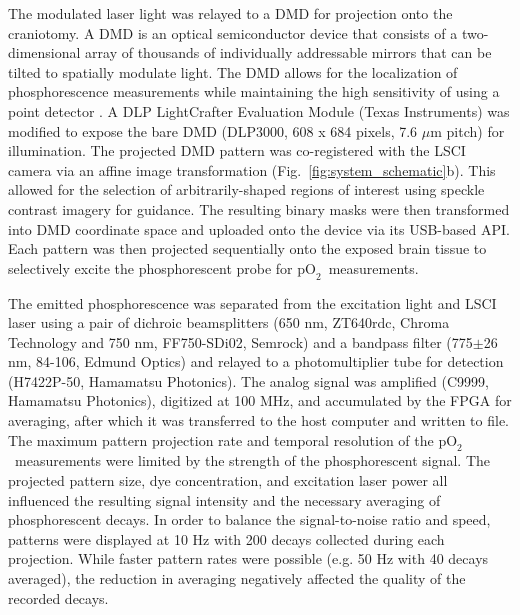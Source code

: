 \documentclass[12pt]{spieman}  %
\newcommand{\pO}{\ensuremath{\text{pO}_2}}
\begin{document}
\begin{spacing}{2}
The modulated laser light was relayed to a DMD for projection onto the craniotomy. A DMD is an optical semiconductor device that consists of a two-dimensional array of thousands of individually addressable mirrors that can be tilted to spatially modulate light. The DMD allows for the localization of phosphorescence measurements while maintaining the high sensitivity of using a point detector \cite{Ponticorvo:2010uv}. A DLP LightCrafter Evaluation Module (Texas Instruments) was modified to expose the bare DMD (DLP3000, 608 x 684 pixels, 7.6 $\mu$m pitch) for illumination. The projected DMD pattern was co-registered with the LSCI camera via an affine image transformation (Fig.~\ref{fig:system_schematic}b). This allowed for the selection of arbitrarily-shaped regions of interest using speckle contrast imagery for guidance. The resulting binary masks were then transformed into DMD coordinate space and uploaded onto the device via its USB-based API. Each pattern was then projected sequentially onto the exposed brain tissue to selectively excite the phosphorescent probe for \pO\ measurements.

The emitted phosphorescence was separated from the excitation light and LSCI laser using a pair of dichroic beamsplitters (650 nm, ZT640rdc, Chroma Technology and 750 nm, FF750-SDi02, Semrock) and a bandpass filter (775$\pm$26 nm, 84-106, Edmund Optics) and relayed to a photomultiplier tube for detection (H7422P-50, Hamamatsu Photonics). The analog signal was amplified (C9999, Hamamatsu Photonics), digitized at 100 MHz, and accumulated by the FPGA for averaging, after which it was transferred to the host computer and written to file. The maximum pattern projection rate and temporal resolution of the \pO\ measurements were limited by the strength of the phosphorescent signal. The projected pattern size, dye concentration, and excitation laser power all influenced the resulting signal intensity and the necessary averaging of phosphorescent decays. In order to balance the signal-to-noise ratio and speed, patterns were displayed at 10 Hz with 200 decays collected during each projection. While faster pattern rates were possible (e.g. 50 Hz with 40 decays averaged), the reduction in averaging negatively affected the quality of the recorded decays.



\end{spacing}
\end{document}
